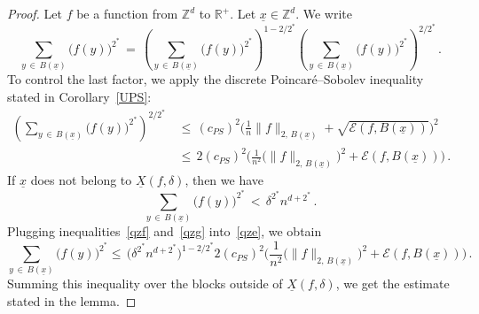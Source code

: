 \documentclass[10pt]{amsart}
\theoremstyle{definition}\newtheorem{defi}[theo]{Definition}\newtheorem{rema}[theo]{Remark}\newtheorem{exam}[theo]{Example}\newtheorem{exem}[theo]{Example}\newtheorem{nota}[theo]{Notation}
\newcommand{\XX}{{\underline{X}}}
\newcommand{\xx}{{\underline{x}}}
\newcommand*\Zd {{\mathbb Z^d}}
\newcommand*\R{\mathbb{R}}
\newcommand{\cE}{\mathcal{E}}
\begin{document}
\begin{proof}
Let $f$ be a function from $\Zd$ to $\R^+$. Let $\xx\in\Zd$. We write
\begin{equation}\label{qze}
\sum_{y\,\in\,B(\xx)}\big(f(y)\big)^{2^*}\,=\,
\left(\sum_{y\,\in\,B(\xx)}\big(f(y)\big)^{2^*}\right)^{1-2/2^*}
\left(\sum_{y\,\in\,B(\xx)}\big(f(y)\big)^{2^*}\right)^{2/2^*}\,.
\end{equation}
To control the last factor, we apply the discrete Poincaré--Sobolev inequality stated in Corollary~\ref{UPS}:
\begin{equation}\label{qzf}
\begin{aligned}
\left(\sum_{y\,\in\,B(\xx)}\big(f(y)\big)^{2^*}\right)^{2/2^*} &\,\leq\, (c_{PS})^2\bigg(\frac{1}{n}
\|f\|_{2,\,B(\xx)}+\sqrt{\cE(f,B(\xx))}\bigg)^2\\
&\,\leq\, 2(c_{PS})^2\bigg(\frac{1}{n^2}
\big(\|f\|_{2,\,B(\xx)}\big)^2+{\cE(f,B(\xx))}\bigg)
\,.
\end{aligned}
\end{equation}
If $\xx$ does not belong to $\XX(f,\delta)$, then we have
\begin{equation}\label{qzg}
\sum_{y\,\in\,B(\xx)}\big(f(y)\big)^{2^*}\,<\,
\delta^{2^*} n^{d+2^*}\,.
\end{equation}
Plugging inequalities~\eqref{qzf} and~\eqref{qzg} into~\eqref{qze}, we obtain
\[
\sum_{y\,\in\,B(\xx)}\!
\big(f(y)\big)^{2^*}\!\leq\,
\big(
\delta^{2^*} n^{d+2^*}
\big)^{1-2/2^*} 2(c_{PS})^2\bigg(\frac{1}{n^2}
\big(\|f\|_{2,\,B(\xx)}\big)^2+{\cE(f,B(\xx))}\bigg)
\,.
\]
Summing this inequality over the blocks outside of $\XX(f,\delta)$, we get the estimate stated in the lemma.
\end{proof}
\end{document}
